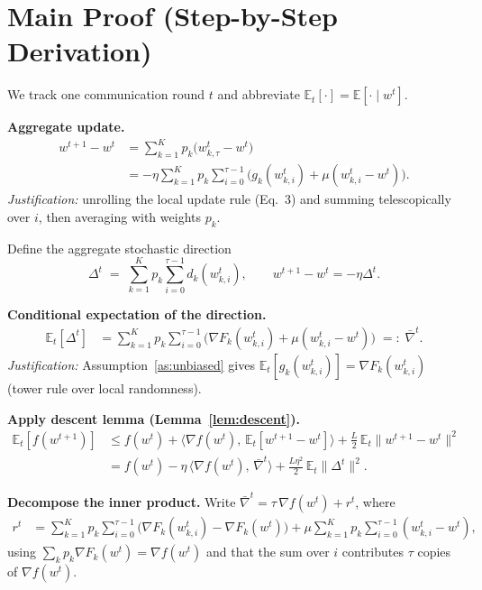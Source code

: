 \documentclass{article}
\begin{document}
\section*{Main Proof (Step-by-Step Derivation)}

We track one communication round $t$ and abbreviate $\mathbb{E}_t[\cdot] = \mathbb{E}[\cdot \mid w^t]$.

\textbf{Aggregate update.}
\begin{align}
w^{t+1} - w^t
&= \sum_{k=1}^K p_k \big(w_{k,\tau}^t - w^t\big) \nonumber\\
&= -\eta \sum_{k=1}^K p_k \sum_{i=0}^{\tau-1}\Big(g_k(w_{k,i}^t) + \mu(w_{k,i}^t - w^t)\Big).
\tag{Step 1}
\end{align}
\emph{Justification:} unrolling the local update rule (Eq.~3) and summing telescopically over $i$, then averaging with weights $p_k$.

Define the aggregate stochastic direction
\[
\Delta^t \;=\; \sum_{k=1}^K p_k \sum_{i=0}^{\tau-1} d_k(w_{k,i}^t),
\qquad
w^{t+1} - w^t = -\eta \Delta^t .
\tag{Step 2}
\]

\textbf{Conditional expectation of the direction.}
\begin{align}
\mathbb{E}_t[\Delta^t]
&= \sum_{k=1}^K p_k \sum_{i=0}^{\tau-1}\Big(\nabla F_k(w_{k,i}^t) + \mu(w_{k,i}^t - w^t)\Big)
\;=:\; \bar\nabla^t .
\tag{Step 3}
\end{align}
\emph{Justification:} Assumption~\ref{as:unbiased} gives $\mathbb{E}_t[g_k(w_{k,i}^t)] = \nabla F_k(w_{k,i}^t)$ (tower rule over local randomness).

\textbf{Apply descent lemma (Lemma~\ref{lem:descent}).}
\begin{align}
\mathbb{E}_t[f(w^{t+1})]
&\le f(w^t) + \langle \nabla f(w^t),\, \mathbb{E}_t[w^{t+1}-w^t]\rangle
 + \frac{L}{2}\,\mathbb{E}_t\|w^{t+1}-w^t\|^2 \nonumber\\
&= f(w^t) - \eta\,\langle \nabla f(w^t),\, \bar\nabla^t\rangle
 + \frac{L\eta^2}{2}\,\mathbb{E}_t\|\Delta^t\|^2 .
\tag{Step 4}
\end{align}

\textbf{Decompose the inner product.} Write $\bar\nabla^t = \tau\,\nabla f(w^t) + r^t$, where
\begin{align}
r^t &= \sum_{k=1}^K p_k \sum_{i=0}^{\tau-1}\Big(\nabla F_k(w_{k,i}^t) - \nabla F_k(w^t)\Big)
 + \mu \sum_{k=1}^K p_k \sum_{i=0}^{\tau-1}(w_{k,i}^t - w^t),
\tag{Step 5}
\end{align}
using $\sum_k p_k \nabla F_k(w^t) = \nabla f(w^t)$ and that the sum over $i$ contributes $\tau$ copies of $\nabla f(w^t)$.
\end{document}
